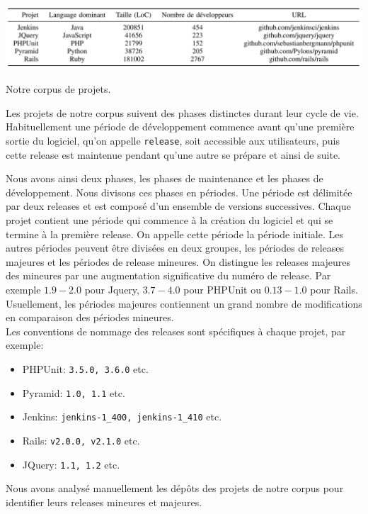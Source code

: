 \begin{table}[h]
	\centering
	\includegraphics[scale=0.204]{data/tables/VCS.png}
	\caption{Notre corpus de projets.}
	\label{tab:corpus}
\end{table}

Les projets de notre corpus suivent des phases distinctes durant leur cycle de vie. Habituellement une période de développement commence avant qu'une première sortie du logiciel, qu'on appelle \texttt{release}, soit accessible aux utilisateurs, puis cette release est maintenue pendant qu'une autre se prépare et ainsi de suite.

Nous avons ainsi deux phases, les phases de maintenance et les phases de développement. Nous divisons ces phases en périodes. Une période est délimitée par deux releases et est composé d'un ensemble de versions successives. Chaque projet contient une période qui commence à la création du logiciel et qui se termine à la première release. On appelle cette période la période initiale. Les autres périodes peuvent être divisées en deux groupes, les périodes de releases majeures et les périodes de release mineures. On distingue les releases majeures des mineures par une augmentation significative du numéro de release. Par exemple $1.9-2.0$ pour Jquery, $3.7-4.0$ pour PHPUnit ou $0.13-1.0$ pour Rails. Usuellement, les périodes majeures contiennent un grand nombre de modifications en comparaison des périodes mineures.\\

Les conventions de nommage des releases sont spécifiques à chaque projet, par exemple:
\begin{itemize}
\item PHPUnit: \texttt{3.5.0, 3.6.0} etc.
\item Pyramid: \texttt{1.0, 1.1} etc.
\item Jenkins: \texttt{jenkins-1\_400, jenkins-1\_410} etc.
\item Rails: \texttt{v2.0.0, v2.1.0} etc.
\item JQuery: \texttt{1.1, 1.2} etc.
\end{itemize}
Nous avons analysé manuellement les dépôts des projets de notre corpus pour identifier leurs releases mineures et majeures.\\


